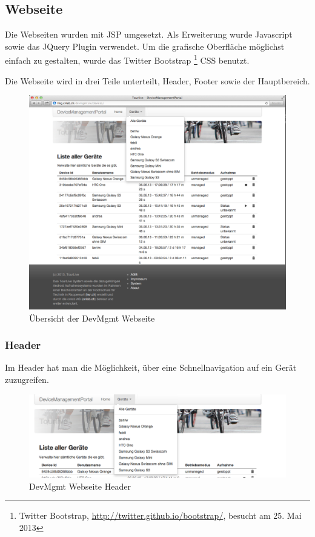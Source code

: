 \subsection{Webseite}
Die Webseiten wurden mit JSP umgesetzt. Als Erweiterung wurde Javascript sowie das JQuery Plugin verwendet. Um die grafische Oberfläche möglichst einfach zu gestalten, wurde das Twitter Bootstrap \footnote{Twitter Bootstrap, \url{http://twitter.github.io/bootstrap/}, besucht am 25. Mai 2013} CSS benutzt.

Die Webseite wird in drei Teile unterteilt, Header, Footer sowie der Hauptbereich. 

\begin{figure}[H]
	\centering
	\includegraphics[width=120mm]{images/devmgmtsrv/all.png}
	\caption{Übersicht der DevMgmt Webseite}
\end{figure}

\subsubsection{Header}
Im Header hat man die Möglichkeit, über eine Schnellnavigation auf ein Gerät zuzugreifen. 
\begin{figure}[H]
	\centering
	\includegraphics[width=120mm]{images/devmgmtsrv/header.png}
	\caption{DevMgmt Webseite Header}
\end{figure}



